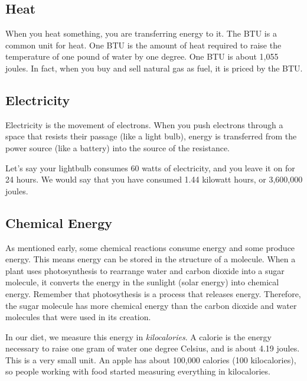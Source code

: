 \subsection{Heat}

When you heat something, you are transferring energy to it. The BTU
 is a common unit for heat. One BTU is the
amount of heat required to raise the temperature of one pound of water
by one degree. One BTU is about 1,055 joules. In fact, when you buy and sell
natural gas as fuel, it is priced by the BTU. 

\subsection{Electricity}

Electricity is the movement of electrons. When you push electrons
through a space that resists their passage (like a light bulb),
energy is transferred from the power source (like a battery)
 into the source of the resistance.

Let's say your lightbulb consumes 60 watts of electricity, and you leave it on for 24 hours.
We would say that you have consumed 1.44 kilowatt hours, or 3,600,000 joules.


\subsection{Chemical Energy}

As mentioned early, some chemical reactions consume energy and some
produce energy. This means energy can be stored in the structure of a
molecule. When a plant uses photosynthesis to rearrange water and
carbon dioxide into a sugar molecule, it converts the energy in
the sunlight (solar energy) into chemical energy. Remember that photosythesis is a process that releases energy.
Therefore, the sugar molecule has more chemical energy than the carbon dioxide and water molecules that were
used in its creation.

In our diet, we measure this energy in \textit{kilocalories}. A
calorie is the energy necessary to raise one gram of water one degree
Celsius, and is about 4.19 joules. This is a very small unit. An apple
has about 100,000 calories (100 kilocalories), so people working with food started
measuring everything in kilocalories.

